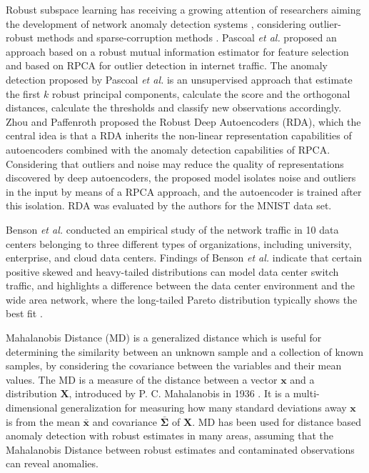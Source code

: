 Robust subspace learning has receiving a growing attention of researchers aiming the development of network anomaly detection systems \cite{rousseeuw1984mcd, rousseeuw1999fastmcd, hubert2005robpca,hubert2009robustskewed, pascoal2012robust, zhou2017anomaly}, considering outlier-robust methods and sparse-corruption methods \cite{lerman2018overview}. Pascoal \emph{et al.} \cite{pascoal2012robust} proposed an approach based on a robust mutual information estimator for feature selection and based on RPCA for outlier detection in internet traffic. The anomaly detection proposed by Pascoal \emph{et al.} is an unsupervised approach that estimate the first $k$ robust principal components, calculate the score and the orthogonal distances, calculate the thresholds and classify new observations accordingly. Zhou and Paffenroth \cite{zhou2017anomaly} proposed the Robust Deep Autoencoders (RDA), which the central idea is that a RDA inherits the non-linear representation capabilities of autoencoders combined with the anomaly detection capabilities of RPCA. Considering that outliers and noise may reduce the quality of representations discovered by deep autoencoders, the proposed model isolates noise and outliers in the input by means of a RPCA approach, and the autoencoder is trained after this isolation. RDA was evaluated by the authors for the MNIST data set.

Benson \emph{et al.} \cite{benson2010network} conducted an empirical study of the network traffic in 10 data centers belonging to three different types of organizations, including university, enterprise, and cloud data centers. Findings of Benson \emph{et al.} indicate that certain positive skewed and heavy-tailed distributions can model data center switch traffic, and highlights a difference between the data center environment and the wide area network, where the long-tailed Pareto distribution typically shows the best fit \cite{benson2010network}.

Mahalanobis Distance (MD) is a generalized distance which is useful for determining the similarity between an unknown sample and a collection of known samples, by considering the covariance between the variables and their mean values. The MD is a measure of the distance between a vector $\pmb{x}$ and a distribution $\pmb{X}$, introduced by P. C. Mahalanobis in 1936 \cite{mahalanobis1936md}. It is a multi-dimensional generalization for measuring how many standard deviations away $\pmb{x}$ is from the mean $\bar{\pmb{x}}$ and covariance $\bar{\pmb{\Sigma}}$ of $\pmb{X}$. MD has been used for distance based anomaly detection with robust estimates in many areas, assuming that the Mahalanobis Distance between robust estimates and contaminated observations can reveal anomalies.

